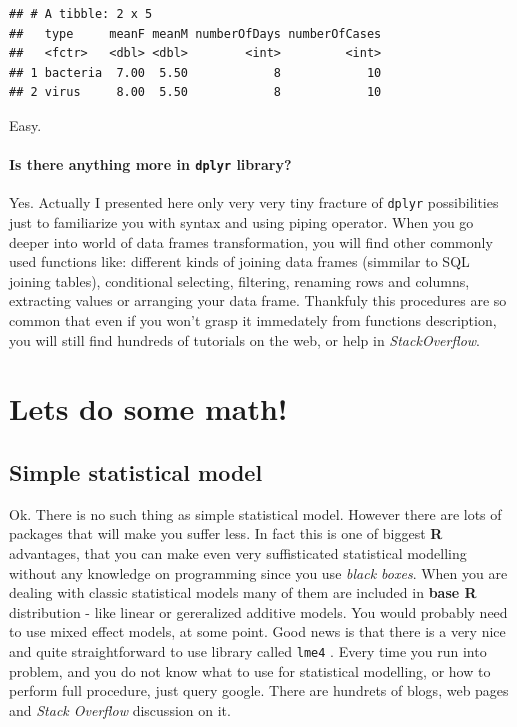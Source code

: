 \documentclass[]{book}
\theoremstyle{definition}
\theoremstyle{definition}
\theoremstyle{definition}
\theoremstyle{remark}
\begin{document}
\begin{verbatim}
## # A tibble: 2 x 5
##   type     meanF meanM numberOfDays numberOfCases
##   <fctr>   <dbl> <dbl>        <int>         <int>
## 1 bacteria  7.00  5.50            8            10
## 2 virus     8.00  5.50            8            10
\end{verbatim}

Easy.

\subsubsection{\texorpdfstring{Is there anything more in \texttt{dplyr}
library?}{Is there anything more in dplyr library?}}\label{is-there-anything-more-in-dplyr-library}

Yes. Actually I presented here only very very tiny fracture of
\texttt{dplyr} possibilities just to familiarize you with syntax and
using piping operator. When you go deeper into world of data frames
transformation, you will find other commonly used functions like:
different kinds of joining data frames (simmilar to SQL joining tables),
conditional selecting, filtering, renaming rows and columns, extracting
values or arranging your data frame. Thankfuly this procedures are so
common that even if you won't grasp it immedately from functions
description, you will still find hundreds of tutorials on the web, or
help in \emph{StackOverflow}.

\chapter{Lets do some math!}\label{lets-do-some-math}

\section{Simple statistical model}\label{simple-statistical-model}

Ok. There is no such thing as simple statistical model. However there
are lots of packages that will make you suffer less. In fact this is one
of biggest \textbf{R} advantages, that you can make even very
suffisticated statistical modelling without any knowledge on programming
since you use \emph{black boxes}. When you are dealing with classic
statistical models many of them are included in \textbf{base R}
distribution - like linear or gereralized additive models. You would
probably need to use mixed effect models, at some point. Good news is
that there is a very nice and quite straightforward to use library
called \texttt{lme4} . Every time you run into problem, and you do not
know what to use for statistical modelling, or how to perform full
procedure, just query google. There are hundrets of blogs, web pages and
\emph{Stack Overflow} discussion on it.
\end{document}
